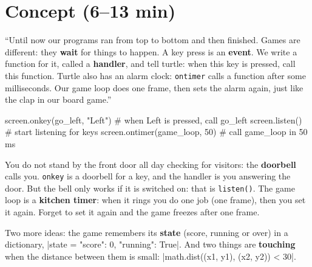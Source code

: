 \section{Concept (6--13 min)}
\begin{teacherscript}[Say]
\enquote{Until now our programs ran from top to bottom and then finished. Games are different: they \textbf{wait} for things to happen.
A key press is an \textbf{event}. We write a function for it, called a \textbf{handler}, and tell turtle: when this key is pressed, call this function.
Turtle also has an alarm clock: \texttt{ontimer} calls a function after some milliseconds. Our game loop does one frame, then sets the alarm again,
just like the clap in our board game.}
\end{teacherscript}
\begin{pycode}
screen.onkey(go_left, "Left")       # when Left is pressed, call go_left
screen.listen()                     # start listening for keys
screen.ontimer(game_loop, 50)       # call game_loop in 50 ms
\end{pycode}
\begin{analogy}
You do not stand by the front door all day checking for visitors: the \textbf{doorbell} calls you. \texttt{onkey} is a doorbell for a key, and the handler
is you answering the door. But the bell only works if it is switched on: that is \texttt{listen()}. The game loop is a \textbf{kitchen timer}:
when it rings you do one job (one frame), then you set it again. Forget to set it again and the game freezes after one frame.
\end{analogy}
Two more ideas: the game remembers its \textbf{state} (score, running or over) in a dictionary, \py|state = {"score": 0, "running": True}|.
And two things are \textbf{touching} when the distance between them is small: \py|math.dist((x1, y1), (x2, y2)) < 30|.

